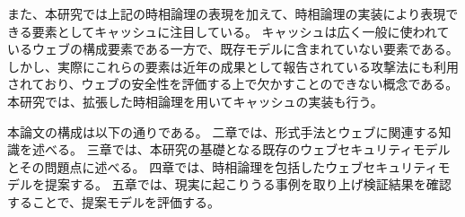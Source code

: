 \documentclass[12pt,a4paper]{jbook}
\begin{document}
また、本研究では上記の時相論理の表現を加えて、時相論理の実装により表現できる要素としてキャッシュに注目している。
キャッシュは広く一般に使われているウェブの構成要素である一方で、既存モデルに含まれていない要素である。
しかし、実際にこれらの要素は近年の成果として報告されている攻撃法\cite{bcpattack}にも利用されており、ウェブの安全性を評価する上で欠かすことのできない概念である。
本研究では、拡張した時相論理を用いてキャッシュの実装も行う。

本論文の構成は以下の通りである。
二章では、形式手法とウェブに関連する知識を述べる。
三章では、本研究の基礎となる既存のウェブセキュリティモデルとその問題点に述べる。
四章では、時相論理を包括したウェブセキュリティモデルを提案する。
五章では、現実に起こりうる事例を取り上げ検証結果を確認することで、提案モデルを評価する。
\end{document}
